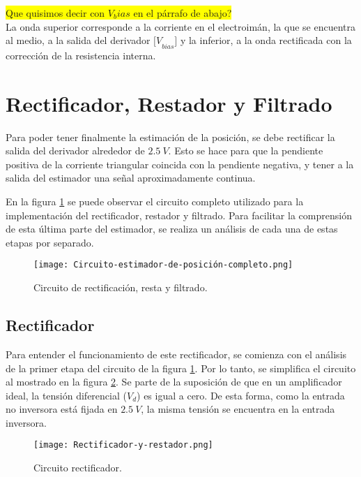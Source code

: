 \colorbox{yellow}{Que quisimos decir con $V_bias$ en el párrafo de abajo?}\\
\noindent La onda superior corresponde a la corriente en el electroim\'{a}n, la que se encuentra al medio, a la salida del derivador ${[V}_{bias}$$]$ y la inferior, a la onda rectificada con la correcci\'{o}n de la resistencia interna.

\section{Rectificador, Restador y Filtrado}

\noindent Para poder tener finalmente la estimaci\'{o}n de la posici\'{o}n, se debe rectificar la salida del derivador alrededor de $2.5\:V$. Esto se hace para que la pendiente positiva de la corriente triangular coincida con la pendiente negativa, y tener a la salida del estimador una se\~{n}al aproximadamente continua.

\noindent En la figura \ref{fig:img_Circuito_estimador_de_posición_completo} se puede observar el circuito completo utilizado para la implementaci\'{o}n del rectificador, restador y filtrado. Para facilitar la comprensión de esta última parte del estimador, se realiza un análisis de cada una de estas etapas por separado.

\begin{figure}[H]
	\centering
	\texttt{[image: Circuito-estimador-de-posición-completo.png]}
	\caption{Circuito de rectificación, resta y filtrado.}
	\label{fig:img_Circuito_estimador_de_posición_completo}
\end{figure}

\subsection{Rectificador}

\noindent Para entender el funcionamiento de este rectificador, se comienza con el análisis de la primer etapa del circuito de la figura \ref{fig:img_Circuito_estimador_de_posición_completo}. Por lo tanto, se simplifica el circuito al mostrado en la figura \ref{fig:img_Rectificador_y_restador}. Se parte de la suposici\'{o}n de que en un amplificador ideal, la tensi\'{o}n diferencial ($V_d$) es igual a cero. De esta forma, como la entrada no inversora est\'{a} fijada en $2.5\:V$, la misma tensi\'{o}n se encuentra en la entrada inversora.


\begin{figure}[H]
	\centering
	\texttt{[image: Rectificador-y-restador.png]}
	\caption{Circuito rectificador.}
	\label{fig:img_Rectificador_y_restador}
\end{figure}

